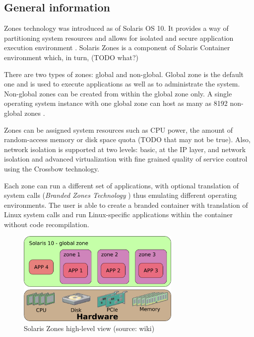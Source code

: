 \documentclass[11pt]{book}
\begin{document}
      \subsection{General information}
      \label{sub:}

        Zones technology was introduced as of Solaris OS 10. It provides a way of partitioning system
        resources and allows for isolated and secure application execution environment \cite{sag}. Solaris Zones is a
        component of Solaris Container environment which, in turn, (TODO what?)

        There are two types of zones: global and non-global. Global zone is the default one and is used to execute
        applications as well as to administrate the system. Non-global zones can be created from within the global zone
        only. A single operating system instance with one global zone can host as many as 8192 non-global zones \cite{sag}.

        Zones can be assigned system resources such as CPU power, the amount of random-access memory or disk space
        quota (TODO that may not be true). Also, network isolation is supported at two levels: basic, at the IP layer, and
        network isolation and advanced virtualization with fine grained quality of service control using the Crossbow technology.

        Each zone can run a different set of applications, with optional translation of system calls
        (\textit{Branded Zones Technology} \cite{sag}) thus emulating different operating
        environments. The user is able to create a branded container with translation of Linux system calls and run
        Linux-specific applications within the container without code recompilation.

        \begin{figure}[H]
          \begin{center}
            \includegraphics[width=0.7\textwidth]{img/solaris/zones.png}
          \end{center}

          \caption{Solaris Zones high-level view (source: wiki)}
        \end{figure}
\end{document}
